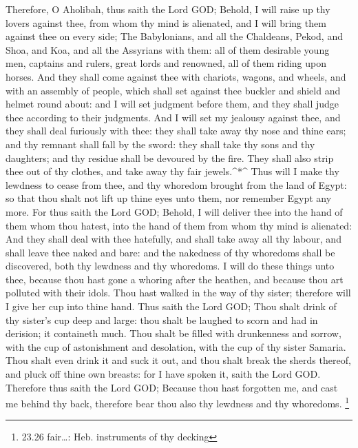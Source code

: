  Therefore, O Aholibah, thus saith the Lord GOD; Behold, I
will raise up thy lovers against thee, from whom thy mind is alienated,
and I will bring them against thee on every side;  The
Babylonians, and all the Chaldeans, Pekod, and Shoa, and Koa, and all
the Assyrians with them: all of them desirable young men, captains and
rulers, great lords and renowned, all of them riding upon horses.
 And they shall come against thee with chariots, wagons,
and wheels, and with an assembly of people, which shall set against thee
buckler and shield and helmet round about: and I will set judgment
before them, and they shall judge thee according to their judgments.
 And I will set my jealousy against thee, and they shall
deal furiously with thee: they shall take away thy nose and thine ears;
and thy remnant shall fall by the sword: they shall take thy sons and
thy daughters; and thy residue shall be devoured by the fire.
 They shall also strip thee out of thy clothes, and take
away thy fair jewels.\^{}*\^{}  Thus will I make thy
lewdness to cease from thee, and thy whoredom brought from the land of
Egypt: so that thou shalt not lift up thine eyes unto them, nor remember
Egypt any more.  For thus saith the Lord GOD; Behold, I
will deliver thee into the hand of them whom thou hatest, into the hand
of them from whom thy mind is alienated:  And they shall
deal with thee hatefully, and shall take away all thy labour, and shall
leave thee naked and bare: and the nakedness of thy whoredoms shall be
discovered, both thy lewdness and thy whoredoms.  I will do
these things unto thee, because thou hast gone a whoring after the
heathen, and because thou art polluted with their idols. 
Thou hast walked in the way of thy sister; therefore will I give her cup
into thine hand.  Thus saith the Lord GOD; Thou shalt drink
of thy sister's cup deep and large: thou shalt be laughed to scorn and
had in derision; it containeth much.  Thou shalt be filled
with drunkenness and sorrow, with the cup of astonishment and
desolation, with the cup of thy sister Samaria.  Thou shalt
even drink it and suck it out, and thou shalt break the sherds thereof,
and pluck off thine own breasts: for I have spoken it, saith the Lord
GOD.  Therefore thus saith the Lord GOD; Because thou hast
forgotten me, and cast me behind thy back, therefore bear thou also thy
lewdness and thy whoredoms. \footnote{23.26 fair\ldots: Heb. instruments
  of thy decking}

